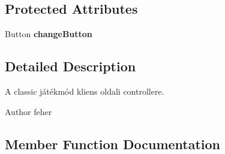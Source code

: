 \subsection*{Protected Attributes}
\begin{DoxyCompactItemize}
\item 
\hypertarget{classhu_1_1elte_1_1bfw1p6_1_1poker_1_1client_1_1controller_1_1game_1_1_classic_main_game_controller_a68d38981b50da61372a99c908fa5a792}{}Button {\bfseries change\+Button}\label{classhu_1_1elte_1_1bfw1p6_1_1poker_1_1client_1_1controller_1_1game_1_1_classic_main_game_controller_a68d38981b50da61372a99c908fa5a792}

\end{DoxyCompactItemize}


\subsection{Detailed Description}
A classic játékmód kliens oldali controllere. \begin{DoxyAuthor}{Author}
feher 
\end{DoxyAuthor}


\subsection{Member Function Documentation}
\hypertarget{classhu_1_1elte_1_1bfw1p6_1_1poker_1_1client_1_1controller_1_1game_1_1_classic_main_game_controller_a7667c2c8a5af742a9212c00fc27222c3}{}
